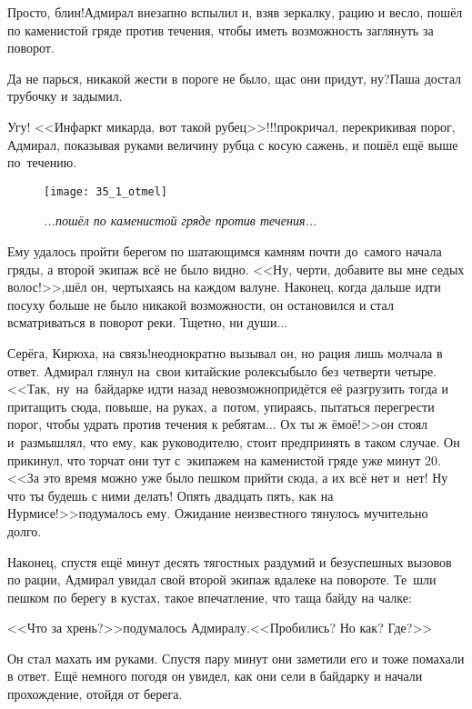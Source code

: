 \diagdash Просто, блин!\mdash Адмирал внезапно вспылил и, взяв зеркалку, рацию и весло, пошёл по каменистой гряде против течения, чтобы иметь возможность заглянуть за поворот.

\diagdash Да не парься, никакой жести в пороге не было, щас они придут, ну?\mdash Паша достал трубочку и задымил.

\diagdash Угу! <<Инфаркт микарда, вот такой рубец>>!!!\mdash прокричал, перекрикивая порог, Адмирал, показывая руками величину рубца с косую сажень, и пошёл ещё выше по~течению.

\begin{figure}[h]
	\centering	
	\texttt{[image: 35\_1\_otmel]}
	\caption{\small\textit{...пошёл по каменистой гряде против течения...}}
\end{figure}

Ему удалось пройти берегом по шатающимся камням почти до~самого начала гряды, а второй экипаж всё не было видно. <<Ну, черти, добавите вы мне седых волос!>>,\mdash шёл он, чертыхаясь на каждом валуне. Наконец, когда дальше идти посуху больше не было никакой возможности, он остановился и стал всматриваться в поворот реки. Тщетно, ни души$\ldots$

\diagdash Серёга, Кирюха, на связь!\mdash неоднократно вызывал он, но рация лишь молчала в ответ. Адмирал глянул на~свои китайские ролексы\mdash было без четверти четыре. <<Так,~ну~на~байдарке идти назад невозможно\mdash придётся её разгрузить тогда и притащить сюда, повыше, на руках, а~потом, упираясь, пытаться перегрести порог, чтобы удрать против течения к ребятам$\ldots$ Ох ты ж ё\sdash моё!>>\mdash он стоял и~размышлял, что ему, как руководителю, стоит предпринять в таком случае. Он прикинул, что торчат они тут с~экипажем на каменистой гряде уже минут 20. <<За это время можно уже было пешком прийти сюда, а их всё нет и~нет! Ну что ты будешь с ними делать! Опять двадцать пять, как на Нурмисе!>>\mdash подумалось ему. Ожидание неизвестного тянулось мучительно долго.

Наконец, спустя ещё минут десять тягостных раздумий и безуспешных вызовов по рации, Адмирал увидал свой второй экипаж вдалеке на повороте. Те~шли пешком по берегу в кустах, такое впечатление, что таща байду на чалке: 

<<Что за хрень?>>\mdash подумалось Адмиралу.\mdash <<Пробились? Но как? Где?>>

Он стал махать им руками. Спустя пару минут они заметили его и тоже помахали в ответ. Ещё немного погодя он увидел, как они сели в байдарку и начали прохождение, отойдя от берега.

